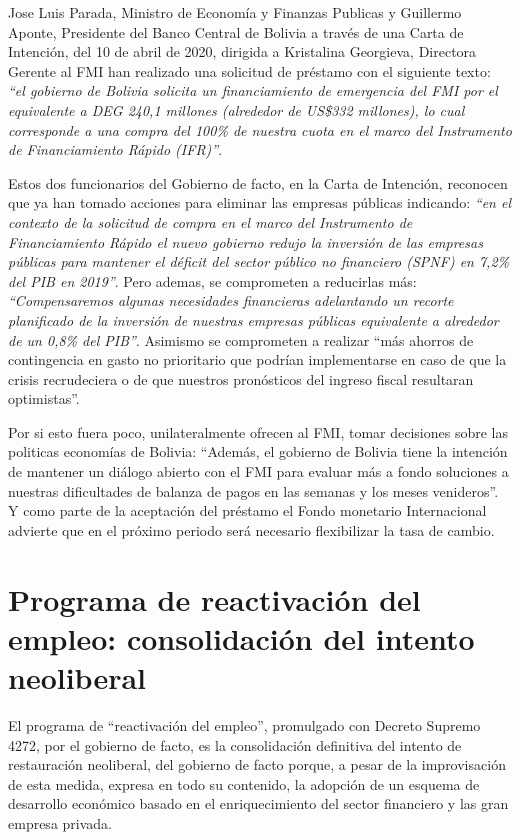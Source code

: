 \documentclass[a4paper, nobind]{templates/ociamthesis}
\begin{document}
Jose Luis Parada, Ministro de Economía y Finanzas Publicas y Guillermo Aponte, Presidente del Banco Central de Bolivia a través de una Carta de Intención, del 10 de abril de 2020, dirigida a Kristalina Georgieva, Directora Gerente al FMI han realizado una solicitud de préstamo con el siguiente texto: \emph{``el gobierno de Bolivia solicita un financiamiento de emergencia del FMI por el equivalente a DEG 240,1 millones (alrededor de US\$332 millones), lo cual corresponde a una compra del 100\% de nuestra cuota en el marco del Instrumento de Financiamiento Rápido (IFR)''}.

Estos dos funcionarios del Gobierno de facto, en la Carta de Intención, reconocen que ya han tomado acciones para eliminar las empresas públicas indicando: \emph{``en el contexto de la solicitud de compra en el marco del Instrumento de Financiamiento Rápido el nuevo gobierno redujo la inversión de las empresas públicas para mantener el déficit del sector público no financiero (SPNF) en 7,2\% del PIB en 2019''}. Pero ademas, se comprometen a reducirlas más: \emph{``Compensaremos algunas necesidades financieras adelantando un recorte planificado de la inversión de nuestras empresas públicas equivalente a alrededor de un 0,8\% del PIB''}. Asimismo se comprometen a realizar ``más ahorros de contingencia en gasto no prioritario que podrían implementarse en caso de que la crisis recrudeciera o de que nuestros pronósticos del ingreso fiscal resultaran optimistas''.

Por si esto fuera poco, unilateralmente ofrecen al FMI, tomar decisiones sobre las politicas economías de Bolivia: ``Además, el gobierno de Bolivia tiene la intención de mantener un diálogo abierto con el FMI para evaluar más a fondo soluciones a nuestras dificultades de balanza de pagos en las semanas y los meses venideros''. Y como parte de la aceptación del préstamo el Fondo monetario Internacional advierte que en el próximo periodo será necesario flexibilizar la tasa de cambio.

\hypertarget{programa-de-reactivaciuxf3n-del-empleo-consolidaciuxf3n-del-intento-neoliberal}{%
\section{Programa de reactivación del empleo: consolidación del intento neoliberal}\label{programa-de-reactivaciuxf3n-del-empleo-consolidaciuxf3n-del-intento-neoliberal}}

El programa de ``reactivación del empleo'', promulgado con Decreto Supremo 4272, por el gobierno de facto, es la consolidación definitiva del intento de restauración neoliberal, del gobierno de facto porque, a pesar de la improvisación de esta medida, expresa en todo su contenido, la adopción de un esquema de desarrollo económico basado en el enriquecimiento del sector financiero y las gran empresa privada.
\end{document}
